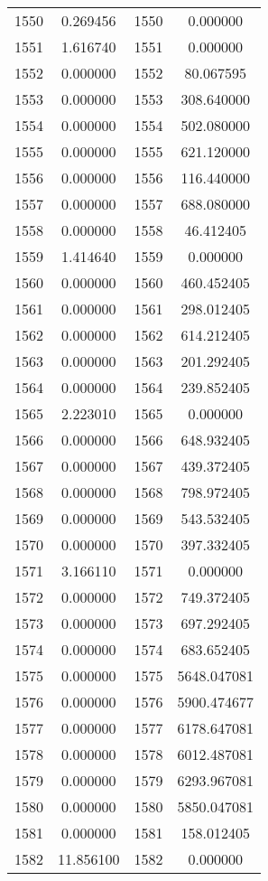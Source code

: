 \documentclass[12pt]{article}
\begin{document}
\begin{longtable}{@{}cccc@{}}
1550 & 0.269456 & 1550 & 0.000000 \\
1551 & 1.616740 & 1551 & 0.000000 \\
1552 & 0.000000 & 1552 & 80.067595 \\
1553 & 0.000000 & 1553 & 308.640000 \\
1554 & 0.000000 & 1554 & 502.080000 \\
1555 & 0.000000 & 1555 & 621.120000 \\
1556 & 0.000000 & 1556 & 116.440000 \\
1557 & 0.000000 & 1557 & 688.080000 \\
1558 & 0.000000 & 1558 & 46.412405 \\
1559 & 1.414640 & 1559 & 0.000000 \\
1560 & 0.000000 & 1560 & 460.452405 \\
1561 & 0.000000 & 1561 & 298.012405 \\
1562 & 0.000000 & 1562 & 614.212405 \\
1563 & 0.000000 & 1563 & 201.292405 \\
1564 & 0.000000 & 1564 & 239.852405 \\
1565 & 2.223010 & 1565 & 0.000000 \\
1566 & 0.000000 & 1566 & 648.932405 \\
1567 & 0.000000 & 1567 & 439.372405 \\
1568 & 0.000000 & 1568 & 798.972405 \\
1569 & 0.000000 & 1569 & 543.532405 \\
1570 & 0.000000 & 1570 & 397.332405 \\
1571 & 3.166110 & 1571 & 0.000000 \\
1572 & 0.000000 & 1572 & 749.372405 \\
1573 & 0.000000 & 1573 & 697.292405 \\
1574 & 0.000000 & 1574 & 683.652405 \\
1575 & 0.000000 & 1575 & 5648.047081 \\
1576 & 0.000000 & 1576 & 5900.474677 \\
1577 & 0.000000 & 1577 & 6178.647081 \\
1578 & 0.000000 & 1578 & 6012.487081 \\
1579 & 0.000000 & 1579 & 6293.967081 \\
1580 & 0.000000 & 1580 & 5850.047081 \\
1581 & 0.000000 & 1581 & 158.012405 \\
1582 & 11.856100 & 1582 & 0.000000 \\

\end{longtable}
\end{document}
